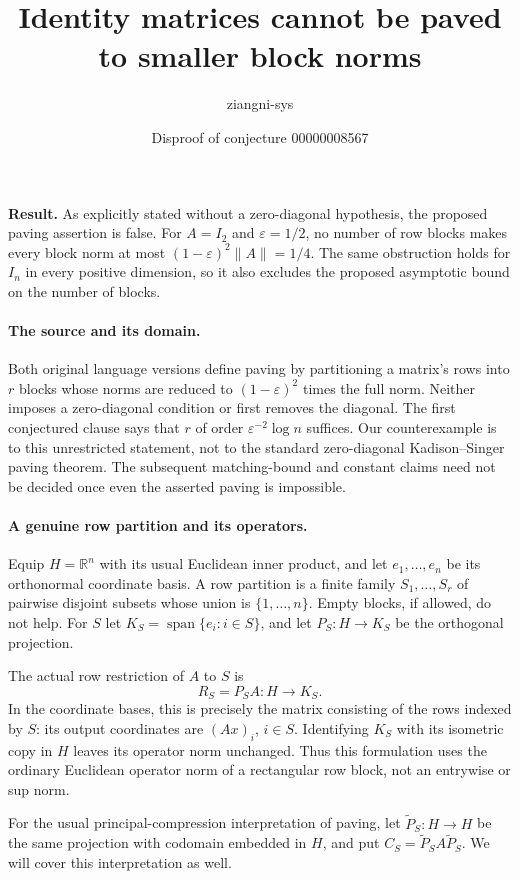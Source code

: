 \documentclass[11pt]{article}
\title{Identity matrices cannot be paved to smaller block norms}
\author{ziangni-sys}
\date{Disproof of conjecture 00000008567}
\begin{document}
\raggedright
\maketitle
\noindent\textbf{Result.} As explicitly stated without a zero-diagonal hypothesis, the proposed paving assertion is false. For $A=I_2$ and $\varepsilon=1/2$, no number of row blocks makes every block norm at most $(1-\varepsilon)^2\|A\|=1/4$. The same obstruction holds for $I_n$ in every positive dimension, so it also excludes the proposed asymptotic bound on the number of blocks.

\paragraph{The source and its domain.}
Both original language versions define paving by partitioning a matrix's rows into $r$ blocks whose norms are reduced to $(1-\varepsilon)^2$ times the full norm. Neither imposes a zero-diagonal condition or first removes the diagonal. The first conjectured clause says that $r$ of order $\varepsilon^{-2}\log n$ suffices. Our counterexample is to this unrestricted statement, not to the standard zero-diagonal Kadison--Singer paving theorem. The subsequent matching-bound and constant claims need not be decided once even the asserted paving is impossible.

\paragraph{A genuine row partition and its operators.}
Equip $H=\mathbb R^n$ with its usual Euclidean inner product, and let $e_1,\ldots,e_n$ be its orthonormal coordinate basis. A row partition is a finite family $S_1,\ldots,S_r$ of pairwise disjoint subsets whose union is $\{1,\ldots,n\}$. Empty blocks, if allowed, do not help. For $S$ let $K_S=\operatorname{span}\{e_i:i\in S\}$, and let $P_S:H\to K_S$ be the orthogonal projection.

The actual row restriction of $A$ to $S$ is
\[
R_S=P_S A:H\longrightarrow K_S.
\]
In the coordinate bases, this is precisely the matrix consisting of the rows indexed by $S$: its output coordinates are $(Ax)_i$, $i\in S$. Identifying $K_S$ with its isometric copy in $H$ leaves its operator norm unchanged. Thus this formulation uses the ordinary Euclidean operator norm of a rectangular row block, not an entrywise or sup norm.

For the usual principal-compression interpretation of paving, let $\widetilde P_S:H\to H$ be the same projection with codomain embedded in $H$, and put $C_S=\widetilde P_S A\widetilde P_S$. We will cover this interpretation as well.
\end{document}
